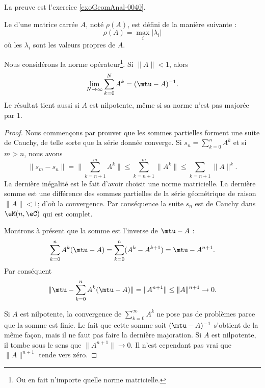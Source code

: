 La preuve est l'exercice \ref{exoGeomAnal-0040}.


\begin{definition}
    Le  d'une matrice carrée $A$, noté $\rho(A)$, est défini de la manière suivante :
    \begin{equation}
        \rho(A)=\max_i|\lambda_i|
    \end{equation}
    où les $\lambda_i$ sont les valeurs propres de $A$.
\end{definition}

\begin{proposition}     \label{PropQAjqUNp}
    Nous considérons la norme opérateur\footnote{Ou en fait n'importe quelle norme matricielle.}. Si \( \| A \|<1\), alors
    \begin{equation}
        \lim_{N\to \infty} \sum_{k=0}^{N}A^k=(\mtu-A)^{-1}.
    \end{equation}
    Le résultat tient aussi si \( A\) est nilpotente, même si sa norme n'est pas majorée par \( 1\).
\end{proposition}

\begin{proof}
    Nous commençons par prouver que les sommes partielles forment une suite de Cauchy, de telle sorte que la série donnée converge. Si \( s_n=\sum_{k=0}^nA^k\) et si \( m>n\), nous avons
    \begin{equation}
        \| s_m-s_n \|=\| \sum_{k=n+1}^mA^k \|\leq\sum_{k=n+1}^m\| A^k \|\leq\sum_{k=n+1}\| A \|^k.
    \end{equation}
    La dernière inégalité est le fait d'avoir choisit une norme matricielle. La dernière somme est une différence des sommes partielles de la série géométrique de raison \( \| A \|<1\); d'où la convergence. Par conséquence la suite \( s_n\) est de Cauchy dans \( \eM(n,\eC)\) qui est complet. 

    Montrons à présent que la somme est l'inverse de \( \mtu-A\) :
    \begin{equation}
        \sum_{k=0}^nA^k(\mtu-A)=\sum_{k=0}^n(A^k-A^{k+1})=\mtu-A^{n+1}.
    \end{equation}
    Par conséquent 
    \begin{equation}
        \| \mtu-\sum_{k=0}^nA^k(\mtu-A) \|=\| A^{n+1} \|\leq \| A \|^{n+1}\to 0.
    \end{equation}

    Si \( A\) est nilpotente, la convergence de \( \sum_{k=0}^{\infty}A^k\) ne pose pas de problèmes parce que la somme est finie. Le fait que cette somme soit \( (\mtu-A)^{-1}\) s'obtient de la même façon, mais il ne faut pas faire la dernière majoration. Si \( A\) est nilpotente, il tombe sous le sens que \( \| A^{n+1} \|\to 0\). Il n'est cependant pas vrai que \( \| A \|^{n+1}\) tende vers zéro.
\end{proof}

